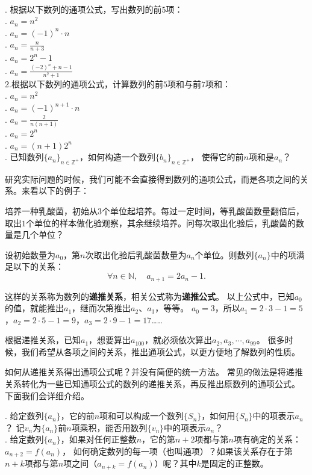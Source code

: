 \documentclass[12pt,UTF8]{ctexbook}
\begin{document}
\begin{xt}
    \mbox{}\\
. 根据以下数列的通项公式，写出数列的前$5$项：\\
. $a_n = n^2$ \\
. $a_n = (-1)^n \cdot n$ \\
. $a_n = \frac{n}{n+3}$ \\
. $a_n = 2^n - 1$ \\
. $a_n = \frac{(-2)^n + n - 1}{n^2 + 1}$ \\
\indent 2.根据以下数列的通项公式，计算数列的前$5$项和与前$7$项和： \\
. $a_n = n^2$ \\
. $a_n = (-1)^{n+1} \cdot n$ \\
. $a_n = \frac{2}{n(n+1)}$ \\
. $a_n = 2^n$ \\
. $a_n = (n+1)2^{n}$ \\
. 已知数列$\{a_n\}_{n\in\mathbb{Z}^+}$，如何构造一个数列$\{b_n\}_{n\in\mathbb{Z}^+}$，
使得它的前$n$项和是$a_n$？
\end{xt}


研究实际问题的时候，我们可能不会直接得到数列的通项公式，而是各项之间的关系。来看以下的例子：
\begin{et}
培养一种乳酸菌，初始从$3$个单位起培养。每过一定时间，等乳酸菌数量翻倍后，
取出$1$个单位的样本做化验观察，其余继续培养。问每次取出化验后，乳酸菌的数量是几个单位？
\end{et}
\begin{so}
设初始数量为$a_0$，第$n$次取出化验后乳酸菌数量为$a_n$个单位。则数列$\{a_n\}$中的项满足以下的关系：
$$ \forall n \in \mathbb{N}, \quad a_{n+1} = 2a_n - 1. $$
\end{so}
这样的关系称为数列的\textbf{递推关系}，相关公式称为\textbf{递推公式}。
以上公式中，已知$a_0$的值，就能推出$a_1$，继而次第推出$a_2$、$a_3$，等等。
$a_0 = 3$，所以$a_1 = 2\cdot 3 - 1= 5$，$a_2 = 2\cdot 5 - 1= 9$，$a_3 = 2\cdot 9 - 1= 17$……

根据递推关系，已知$a_1$，想要算出$a_{100}$，就必须依次算出$a_2,a_3,\cdots,a_{99}$。
很多时候，我们希望从各项之间的关系，推出通项公式，以更方便地了解数列的性质。

如何从递推关系得出通项公式呢？并没有简便的统一方法。
常见的做法是将递推关系转化为一些已知通项公式的数列的递推关系，再反推出原数列的通项公式。
下面我们会详细介绍。

\begin{sk}
    . 给定数列$\{a_n\}$，它的前$n$项和可以构成一个数列$\{S_n\}$，如何用$\{S_n\}$中的项表示$a_n$？
记$v_n$为$\{a_n\}$前$n$项乘积，能否用数列$\{v_n\}$中的项表示$a_n$？\\
    . 给定数列$\{a_n\}$，如果对任何正整数$n$，它的第$n+2$项都与第$n$项有确定的关系：$a_{n+2} = f(a_n)$，
    如何确定数列的每一项（也叫通项）？如果该关系存在于第$n+k$项都与第$n$项之间（$a_{n+k} = f(a_n)$）呢？其中$k$是固定的正整数。
\end{sk}
\end{document}
